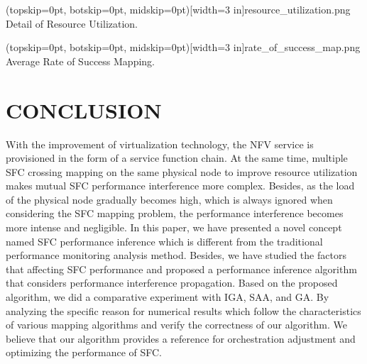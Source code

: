 \documentclass{ieeeaccess}
\begin{document}
\Figure[t!](topskip=0pt, botskip=0pt, midskip=0pt)[width=3 in]{resource_utilization.png}
{ Detail of Resource Utilization.\label{fig4}}


\Figure[t!](topskip=0pt, botskip=0pt, midskip=0pt)[width=3 in]{rate_of_success_map.png}
{ Average Rate of Success Mapping.\label{fig5}}

\section{CONCLUSION}
 With the improvement of virtualization technology, the NFV service is provisioned in the form of a service function chain. At the same time, multiple SFC crossing mapping on the same physical node to improve resource utilization makes mutual SFC performance interference more complex. Besides, as the load of the physical node gradually becomes high, which is always ignored when considering the SFC mapping problem, the performance interference becomes more intense and negligible. In this paper, we have presented a novel concept named SFC performance inference which is different from the traditional performance monitoring analysis method. Besides, we have studied the factors that affecting SFC performance and proposed a performance inference algorithm that considers performance interference propagation. Based on the proposed algorithm, we did a comparative experiment with IGA, SAA, and GA. By analyzing the specific reason for numerical results which follow the characteristics of various mapping algorithms and verify the correctness of our algorithm. We believe that our algorithm provides a reference for orchestration adjustment and optimizing the performance of SFC.
\end{document}
